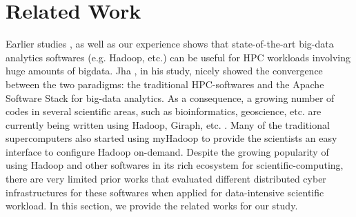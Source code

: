 \documentclass[conference]{IEEEtran}
\begin{document}
\section {Related Work} \label{Related Work}
Earlier studies \cite{schadoop:fadika} \cite{schadoop:jha}, as well as our experience shows that state-of-the-art big-data analytics softwares (e.g. Hadoop, etc.) can be useful for HPC workloads involving huge amounts of bigdata.
Jha \cite{schadoop:jha}, in his study, nicely showed the convergence between the two paradigms: the traditional HPC-softwares and the Apache Software Stack for big-data analytics.
As a consequence, a growing number of codes in several scientific areas, such as bioinformatics, geoscience, etc. are currently being written using Hadoop, Giraph, etc. \cite{fw:myhadoop}.
Many of the traditional supercomputers also started using myHadoop \cite{fw:myhadoop} to provide the scientists an easy interface to configure Hadoop on-demand. 
Despite the growing popularity of using Hadoop and other softwares in its rich ecosystem for scientific-computing, there are very limited prior works that evaluated different distributed cyber infrastructures for these softwares when applied for data-intensive scientific workload.
In this section, we provide the related works for our study.

\end{document}
